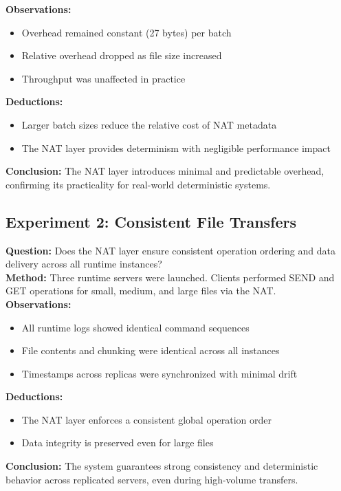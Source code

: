\documentclass[10pt, 
]{IEEEtran}
\begin{document}
\textbf{Observations:}
\begin{itemize}
    \item Overhead remained constant (27 bytes) per batch
    \item Relative overhead dropped as file size increased
    \item Throughput was unaffected in practice
\end{itemize}
\textbf{Deductions:}
\begin{itemize}
    \item Larger batch sizes reduce the relative cost of NAT metadata
    \item The NAT layer provides determinism with negligible performance impact
\end{itemize}
\textbf{Conclusion:} The NAT layer introduces minimal and predictable overhead, confirming its practicality for real-world deterministic systems.

\subsection{Experiment 2: Consistent File Transfers}
\textbf{Question:} Does the NAT layer ensure consistent operation ordering and data delivery across all runtime instances? \\
\textbf{Method:} Three runtime servers were launched. Clients performed SEND and GET operations for small, medium, and large files via the NAT. \\
\textbf{Observations:}
\begin{itemize}
    \item All runtime logs showed identical command sequences
    \item File contents and chunking were identical across all instances
    \item Timestamps across replicas were synchronized with minimal drift
\end{itemize}
\textbf{Deductions:}
\begin{itemize}
    \item The NAT layer enforces a consistent global operation order
    \item Data integrity is preserved even for large files
\end{itemize}
\textbf{Conclusion:} The system guarantees strong consistency and deterministic behavior across replicated servers, even during high-volume transfers.
\end{document}
